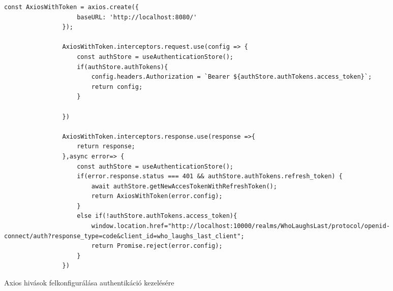 \documentclass[a4paper,twoside]{article}
\begin{document}
\begin{figure}
 	\caption{Axios hivások felkonfigurálása authentikáció kezelésére}
 	\begin{adjustwidth}{0cm}{10cm}
 		\begin{minipage}{\textwidth}
 			\begin{lstlisting}[style=javascriptStyle]
 				const AxiosWithToken = axios.create({
 					baseURL: 'http://localhost:8080/'
 				});
 				
 				AxiosWithToken.interceptors.request.use(config => {
 					const authStore = useAuthenticationStore();
 					if(authStore.authTokens){
 						config.headers.Authorization = `Bearer ${authStore.authTokens.access_token}`;
 						return config;
 					}
 					
 				})
 				
 				AxiosWithToken.interceptors.response.use(response =>{
 					return response;
 				},async error=> {
 					const authStore = useAuthenticationStore();
 					if(error.response.status === 401 && authStore.authTokens.refresh_token) {
 						await authStore.getNewAccesTokenWithRefreshToken();
 						return AxiosWithToken(error.config);
 					}
 					else if(!authStore.authTokens.access_token){
 						window.location.href="http://localhost:10000/realms/WhoLaughsLast/protocol/openid-connect/auth?response_type=code&client_id=who_laughs_last_client";
 						return Promise.reject(error.config);
 					}
 				})
 			\end{lstlisting}
 		\end{minipage}
 	\end{adjustwidth}
 	\label{axios}
\end{figure}

\newpage
\end{document}
